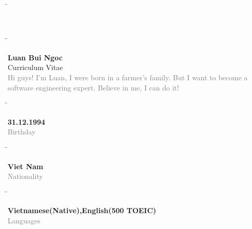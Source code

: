 \documentclass[a4paper,12pt]{article}
\begin{document}
\begin{tabbing}
\=
\begin{minipage}{0.3\textwidth}
	\\
\end{minipage}

\=
\begin{minipage}{0.61\textwidth}
\begin{flushleft}
\textbf{\LARGE Luan Bui Ngoc\\}
\textcolor{Cerulean}{\large Curriculum Vitae\\}
\textcolor{gray}{Hi guys! I'm Luan, I were born in a farmer's family. But I want to become a software
 engineering expert. Believe in me, I can do it!\\}
\end{flushleft}
\end{minipage}

\end{tabbing}

\begin{tabbing}
\=
\begin{minipage}{0.25\textwidth}
\begin{flushleft}
\textbf{31.12.1994}\\
\textcolor{gray}{Birthday}
\end{flushleft}
\end{minipage}
\=
\begin{minipage}{0.25\textwidth}
\begin{flushleft}
\textbf{Viet Nam}\\
\textcolor{gray}{Nationality\\}
\end{flushleft}
\end{minipage}
\=
\begin{minipage}{0.5\textwidth}
\begin{flushleft}
\textbf{Vietnamese(Native),English(500 TOEIC)\\}
\textcolor{gray}{Languages\\}
\end{flushleft}
\end{minipage}
\end{tabbing}
\end{document}
